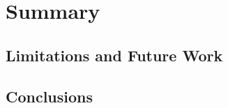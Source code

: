 \chapter{Summary}
\label{chp:summary}

\section{Limitations and Future Work}





\section{Conclusions}
